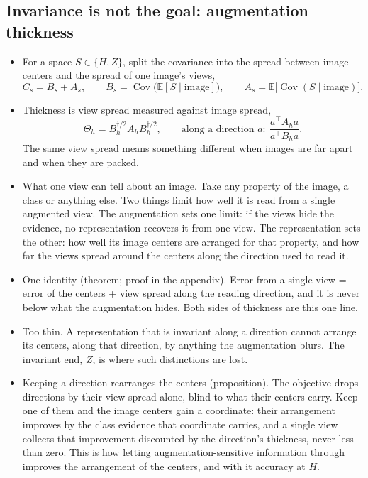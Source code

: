 \documentclass[11pt]{article}
\numberwithin{equation}{section}
\theoremstyle{definition}
\theoremstyle{remark}
\newcommand{\E}{\mathbb{E}}
\newcommand{\Cov}{\operatorname{Cov}}
\begin{document}
\subsection{Invariance is not the goal: augmentation thickness}
\begin{itemize}
    \item For a space \(S \in \{H, Z\}\), split the covariance into the spread between
    image centers and the spread of one image's views,
    \[
        C_s = B_s + A_s,
        \qquad
        B_s = \Cov\big(\E[S \mid \text{image}]\big),
        \qquad
        A_s = \E\big[\Cov(S \mid \text{image})\big].
    \]

    \item Thickness is view spread measured against image spread,
    \[
        \Theta_h = B_h^{\dagger/2} A_h B_h^{\dagger/2},
        \qquad
        \text{along a direction } a:\ \frac{a^\top A_h a}{a^\top B_h a}.
    \]
    The same view spread means something different when images are far apart and when
    they are packed.

    \item What one view can tell about an image. Take any property of the image, a class
    or anything else. Two things limit how well it is read from a single augmented view. The
    augmentation sets one limit: if the views hide the evidence, no representation recovers
    it from one view. The representation sets the other: how well its image centers are
    arranged for that property, and how far the views spread around the centers along the
    direction used to read it.

    \item One identity (theorem; proof in the appendix). Error from a single view = error of
    the centers + view spread along the reading direction, and it is never below what the
    augmentation hides. Both sides of thickness are this one line.

    \item Too thin. A representation that is invariant along a direction cannot arrange its
    centers, along that direction, by anything the augmentation blurs. The invariant end,
    \(Z\), is where such distinctions are lost.

    \item Keeping a direction rearranges the centers (proposition). The objective drops
    directions by their view spread alone, blind to what their centers carry. Keep one of
    them and the image centers gain a coordinate: their arrangement improves by the class
    evidence that coordinate carries, and a single view collects that improvement discounted
    by the direction's thickness, never less than zero. This is how letting
    augmentation-sensitive information through improves the arrangement of the centers, and
    with it accuracy at \(H\).


\end{itemize}
\end{document}
